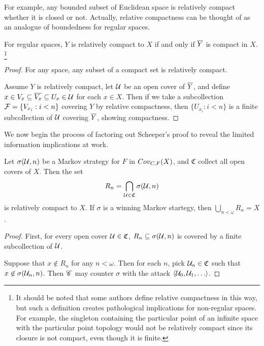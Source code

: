 For example, any bounded subset of Euclidean space is relatively compact
whether it is closed or not. Actually, relative compactness can be thought
of as an analogue of boundedness for regular spaces.

\begin{prop}
  For regular spaces, $Y$ is relatively compact to $X$ if and only if
  $\overline{Y}$ is compact in $X$.
  \footnote{
    It should be noted that some authors define relative compactness in
    this way, but such a definition creates pathological implications for
    non-regular spaces. For example, the singleton containing
    the particular point of an infinite space with the particular point topology
    would not be relatively compact since its closure is not compact, even
    though it is finite.
  }
\end{prop}

\begin{proof}
  For any space, any subset of a compact set is relatively compact.

  Assume $Y$ is relatively compact, let $\mathcal{U}$ be an open cover of $\overline{Y}$,
  and define $x\in V_x\subseteq \overline{V_x}\subseteq U_x \in \mathcal{U}$ for each
  $x\in X$. Then if we take a subcollection $\mathcal{F} = \{V_{x_i} : i<n\}$ covering
  $Y$ by relative compactness, then $\{U_{x_i}:i<n\}$ is a finite subcollection
  of $\mathcal{U}$ covering $\overline{Y}$, showing compactness.
\end{proof}

We now begin the process of factoring out Scheeper's proof to reveal the
limited information implications at work.

\begin{lem}
  Let $\sigma(\mathcal{U}, n)$ be a Markov strategy for $F$ in
  $Cov_{C,F}(X)$, and $\mathfrak{C}$ collect all open covers of $X$. Then the
  set
    \[
      R_n = \bigcap_{\mathcal{U}\in\mathfrak{C}} \sigma(\mathcal{U},n)
    \]
  is relatively compact to $X$. If $\sigma$ is a winning
  Markov startegy, then $\bigcup_{n<\omega} R_n = X$.
\end{lem}

\begin{proof}
  First, for every open cover $\mathcal{U}\in\mathfrak C$,
  $R_n\subseteq\sigma(\mathcal{U},n)$ is covered by a finite subcollection of $\mathcal{U}$.

  Suppose that $x \not\in R_n$ for any $n<\omega$. Then for each $n$,
  pick $\mathcal{U}_n\in\mathfrak{C}$ such that $x\not\in \sigma(\mathcal{U}_n,n)$. Then
  $\mathscr{C}$ may counter $\sigma$ with the attack $\<\mc U_0,\mc U_1,\dots\>$.
\end{proof}

